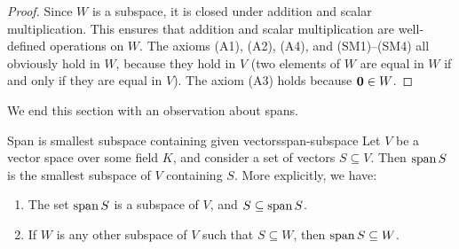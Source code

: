 \begin{proof}
  Since $W$ is a subspace, it is closed under addition and scalar
  multiplication. This ensures that addition and scalar multiplication
  are well-defined operations on $W$. The axioms (A1), (A2), (A4), and
  (SM1)--(SM4) all obviously hold in $W$, because they hold in $V$
  (two elements of\/ $W$ are equal in $W$ if and only if they are equal
  in $V$). The axiom (A3) holds because $\mbox{\bf 0}\in W$.
\end{proof}

We end this section with an observation about spans.

\begin{proposition}{Span is smallest subspace containing given vectors}{span-subspace}
  Let $V$ be a vector space over some field $K$, and consider a set of
  vectors $S\subseteq V$. Then $\sspan S$ is the smallest subspace of\/
  $V$ containing $S$. More explicitly, we have:
  \begin{enumialphparenastyle}
    \begin{enumerate}
    \item The set $\sspan S$ is a subspace of\/ $V$, and
      $S\subseteq \sspan S$.
    \item If $W$ is any other subspace of\/ $V$ such that
      $S\subseteq W$, then $\sspan S\subseteq W$.
    \end{enumerate}
  \end{enumialphparenastyle}
\end{proposition}

